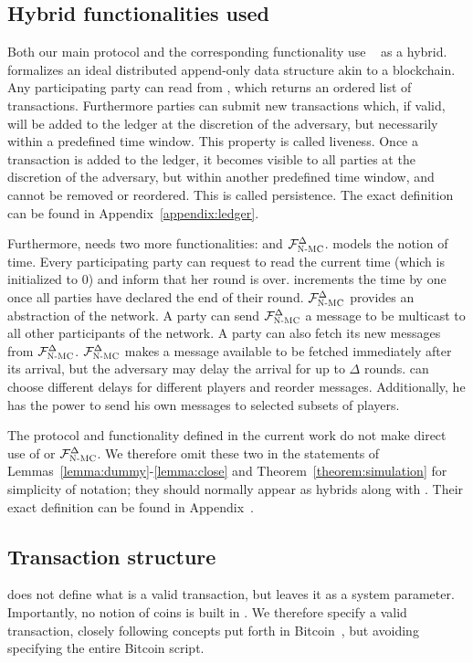   \subsection{Hybrid functionalities used}
    Both our main protocol and the corresponding functionality use
    \ledger~\cite{BMTZ17,genesis} as a hybrid. \ledger{} formalizes an ideal
    distributed append-only data structure akin to a blockchain. Any
    participating party can read from \ledger, which returns an ordered list
    of transactions. Furthermore parties can submit new transactions which, if
    valid, will be added to the ledger at the discretion of the adversary, but
    necessarily within a predefined time window. This property is called
    liveness. Once a transaction is added to the ledger, it becomes visible to
    all parties at the discretion of the adversary, but within another
    predefined time window, and cannot be removed or reordered. This is called
    persistence. The exact definition can be found in
    Appendix~\ref{appendix:ledger}.

    Furthermore, \ledger{} needs two more functionalities: \Fclock and
    $\mathcal{F}_{\textsc{N-MC}}^\Delta$. \Fclock models the notion of time. Every participating
    party can request to read the current time (which is initialized to 0) and
    inform \Fclock that her round is over. \Fclock increments the time by one
    once all parties have declared the end of their round. $\mathcal{F}_{\textsc{N-MC}}^\Delta$
    provides an abstraction of the network. A party can send
    $\mathcal{F}_{\textsc{N-MC}}^\Delta$ a message to be multicast to all other participants of
    the network. A party can also fetch its new messages from
    $\mathcal{F}_{\textsc{N-MC}}^\Delta$. $\mathcal{F}_{\textsc{N-MC}}^\Delta$ makes a message available to be
    fetched immediately after its arrival, but the adversary may delay the
    arrival for up to $\Delta$ rounds. \adversary{} can choose different delays
    for different players and reorder messages. Additionally, he has the power
    to send his own messages to selected subsets of players.

    The protocol and functionality defined in the current work do not make
    direct use of \Fclock or $\mathcal{F}_{\textsc{N-MC}}^\Delta$. We therefore omit these two
    in the statements of Lemmas~\ref{lemma:dummy}-\ref{lemma:close} and
    Theorem~\ref{theorem:simulation} for simplicity of notation; they should
    normally appear as hybrids along with \ledger. Their exact definition can be
    found in Appendix~.

  \subsection{Transaction structure}
    \ledger{} does not define what is a valid transaction, but leaves it as a
    system parameter. Importantly, no notion of coins is built in \ledger. We
    therefore specify a valid transaction, closely following concepts put forth
    in Bitcoin~\cite{bitcoin}, but avoiding specifying the entire Bitcoin
    script.

